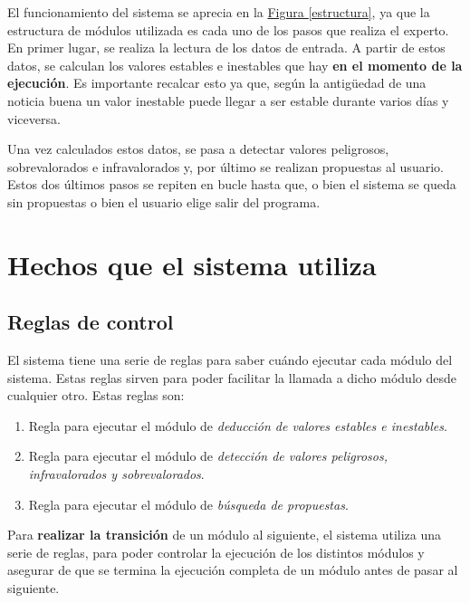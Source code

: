 \documentclass[11pt,openany]{book} %
\begin{document}
El funcionamiento del sistema se aprecia en la \hyperref[estructura]{Figura \ref*{estructura}}, ya que la estructura de módulos utilizada es cada uno de los pasos que realiza el experto. En primer lugar, se realiza la lectura de los datos de entrada. A partir de estos datos, se calculan los valores estables e inestables que hay \textcolor{ocre}{\textbf{en el momento de la ejecución}}. Es importante recalcar esto ya que, según la antigüedad de una noticia buena un valor inestable puede llegar a ser estable durante varios días y viceversa. 

Una vez calculados estos datos, se pasa a detectar valores peligrosos, sobrevalorados e infravalorados y, por último se realizan propuestas al usuario. Estos dos últimos pasos se repiten en bucle hasta que, o bien el sistema se queda sin propuestas o bien el usuario elige salir del programa.

\section{Hechos que el sistema utiliza}

\subsection{Reglas de control}
El sistema tiene una serie de reglas para saber cuándo ejecutar cada módulo del sistema. Estas reglas sirven para poder facilitar la llamada a dicho módulo desde cualquier otro. Estas reglas son:

\begin{enumerate}[\qquad\color{ocre}{$\bullet$}]
    \item Regla para ejecutar el módulo de \textcolor{ocre}{\textit{deducción de valores estables e inestables}}.

    \item Regla para ejecutar el módulo de \textcolor{ocre}{\textit{detección de valores peligrosos, infravalorados y sobrevalorados}}.

    \item Regla para ejecutar el módulo de \textit{\textcolor{ocre}{búsqueda de propuestas}}.
\end{enumerate}

Para \textbf{\textcolor{ocre}{realizar la transición}} de un módulo al siguiente, el sistema utiliza una serie de reglas, para poder controlar la ejecución de los distintos módulos y asegurar de que se termina la ejecución completa de un módulo antes de pasar al siguiente. 
\end{document}
